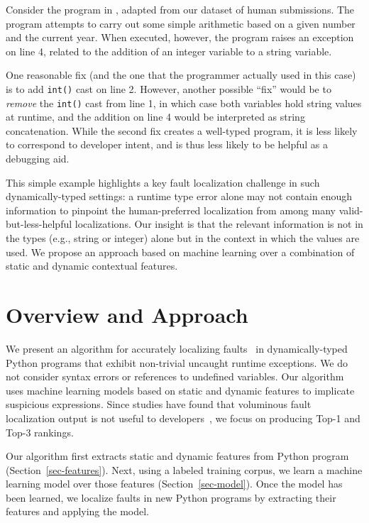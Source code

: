 \documentclass[conference]{IEEEtran}
\newcommand\lt[1]{{\lstinline|#1|}}
\begin{document}
Consider the program in , adapted from our dataset of
human submissions. The program attempts to carry out some simple arithmetic
based on a given number and the current year. When executed, however, the
program raises an exception on line 4, related to the addition of an
integer variable to a string variable.

One reasonable fix (and the one that the programmer actually used in this
case) is to add \lt{int()} cast on line 2. However, another possible
``fix'' would be to \textit{remove} the \lt{int()} cast from line 1, in
which case both variables hold string values at runtime, and the addition
on line 4 would be interpreted as string concatenation. While the second
fix creates a well-typed program, it is less likely to correspond to
developer intent, and is thus less likely to be helpful as a debugging aid. 

This simple example highlights a key fault localization challenge in such
dynamically-typed settings: a runtime type error alone may not contain
enough information to pinpoint the human-preferred localization from among
many valid-but-less-helpful localizations. Our insight is that the relevant
information is not in the types (e.g., string or integer) alone but in the
context in which the values are used.  We propose an approach based on
machine learning over a combination of static and dynamic contextual
features. 


\section{Overview and Approach}

We present an algorithm for accurately localizing faults~\cite{tarantula} in
dynamically-typed Python programs that exhibit non-trivial uncaught runtime
exceptions. We do not consider syntax errors or references to undefined
variables. Our algorithm uses machine learning models based on static and
dynamic features to implicate suspicious expressions. Since studies have
found that voluminous fault localization output is not useful to
developers~\cite{orso-parnin,orso-parnin2015}, we focus on producing
Top-1 and Top-3 rankings.

Our algorithm first extracts static and dynamic features from Python
program (Section~\ref{sec-features}). Next, using a labeled training
corpus, we learn a machine learning model over those features
(Section~\ref{sec-model}). Once the model has been learned, we localize
faults in new Python programs by extracting their features and applying the
model.
\end{document}
